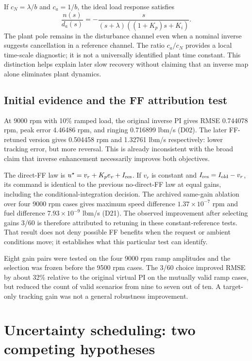 If $c_N=\lambda/b$ and $c_a=1/b$, the ideal load response satisfies
\begin{equation}
\frac{n(s)}{d_a(s)}=-\frac{s}{(s+\lambda)((1+K_p)s+K_i)}.
\end{equation}
The plant pole remains in the disturbance channel even when a nominal inverse suggests cancellation in a reference channel. The ratio $c_a/c_N$ provides a local time-scale diagnostic; it is not a universally identified plant time constant. This distinction helps explain later slow recovery without claiming that an inverse map alone eliminates plant dynamics.

\section{Initial evidence and the FF attribution test}
At 9000 rpm with 10\% ramped load, the original inverse PI gives RMSE 0.744078 rpm, peak error 4.46486 rpm, and ringing 0.716899 lbm/s (D02). The later FF-retuned version gives 0.504458 rpm and 1.32761 lbm/s respectively: lower tracking error, but more reversal. This is already inconsistent with the broad claim that inverse enhancement necessarily improves both objectives.

The direct-FF law is $u^\star=v_r+K_pe_v+I_{\rm res}$. If $v_r$ is constant and $I_{\rm res}=I_{\rm old}-v_r$, its command is identical to the previous no-direct-FF law at equal gains, including the conditional-integration decision. The archived same-gain ablation over four 9000 rpm cases gives maximum speed difference $1.37\times10^{-7}$ rpm and fuel difference $7.93\times10^{-9}$ lbm/s (D21). The observed improvement after selecting gains 3/60 is therefore attributed to retuning in these constant-reference tests. That result does not deny possible FF benefits when the request or ambient conditions move; it establishes what this particular test can identify.

Eight gain pairs were tested on the four 9000 rpm ramp amplitudes and the selection was frozen before the 9500 rpm cases. The 3/60 choice improved RMSE by about 32\% relative to the original virtual PI on the mutually valid ramp cases, but reduced the count of valid scenarios from nine to seven out of ten. A target-only tracking gain was not a general robustness improvement.


\chapter{Uncertainty scheduling: two competing hypotheses}

